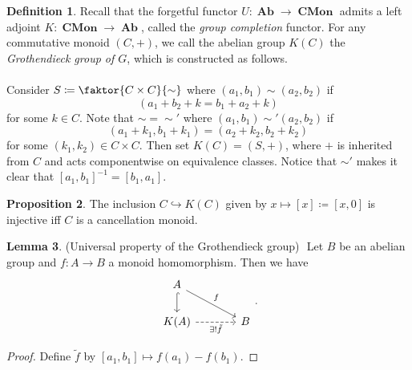 \documentclass[10pt,letterpaper,cm]{nupset}
\theoremstyle{definition}
\newtheorem{definition}{Definition}
\theoremstyle{theorem}
\newtheorem{lemma}[definition]{Lemma}
\newtheorem{prop}[definition]{Proposition}
\theoremstyle{remark}
\newcommand{\1}{\mathbf{1}}
\newcommand{\0}{\vec 0}
\DeclareMathOperator{\Ab}{\mathbf{Ab}}
\DeclareMathOperator{\Cmon}{\mathbf{CMon}}
\begin{document}
\begin{abstract}
We begin low-dimensional $K$-theory, i.e., describe $K_0(-)$, $K_1(-)$, and $K_2(-)$, in various settings. The main sources for this talk are the following.
\begin{itemize}
\item \textit{nLab}.
\item Charles Weibel's \textit{The} K\textit{-book: an introduction to algebraic} K\textit{-theory}. Chapters I and II.
\item Eric M. Friedlander's \textit{An Introduction to} K\textit{-theory}, Chapter 1.
\end{itemize}
\end{abstract}

\begin{definition}
Recall that the forgetful functor $U: \Ab \to \Cmon$ admits a left adjoint $K: \Cmon \to \Ab$, called the \textit{group completion} functor. For any commutative monoid $(C, +)$, we call the abelian group $K(C)$ the \textit{Grothendieck group of $G$}, which is constructed as follows.
\\ \\ Consider $S\coloneqq \faktor{C \times C}{\sim}$ where $(a_1, b_1) \sim (a_2, b_2)$ if $$(a_1 + b_2 +k = b_1 + a_2 +k)$$ for some $k\in C$. Note that $\sim = \sim'$ where $(a_1, b_1) \sim' (a_2, b_2)$ if $$(a_1 + k_1, b_1 + k_1) = (a_2 +k_2, b_2 + k_2)$$ for some $(k_1, k_2) \in C\times C$. Then set $K(C) = (S, +)$, where $+$ is inherited from $C$ and acts componentwise on equivalence classes. Notice that $\sim'$ makes it clear that $[a_1, b_1]^{-1} = [b_1, a_1]$.
\end{definition}

\begin{prop}
The inclusion $C \hookrightarrow K(C)$ given by $x \mapsto [x]\coloneqq[x, 0]$ is injective iff $C$ is a cancellation monoid.
\end{prop}

\begin{lemma}{(Universal property of the Grothendieck group)} $ $
Let $B$ be an abelian group and $f: A \to B$ a monoid homomorphism. Then we have 
\[
\begin{tikzcd}[column sep=large]
A \arrow[rd, "f"] \arrow[d, hook] &  \\
K(A) \arrow[swap, r, "\exists! \tilde{f}", dashed] & B
\end{tikzcd}.
\]
\end{lemma}
\begin{proof}
Define $\tilde{f}$ by $[a_1, b_1]\mapsto f(a_1) - f(b_1)$.
\end{proof}
\end{document}
